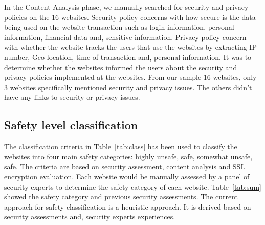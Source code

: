 \documentclass[conference]{IEEEtran}
\begin{document}
In the Content Analysis phase, we manually searched for security and
privacy policies on the 16 websites. Security policy concerns with how
secure is the data being used on the website transaction such as login
information, personal information, financial data and, sensitive
information. Privacy policy concern with whether the website tracks
the users that use the websites by extracting IP number, Geo location,
time of transaction and, personal information. It was to determine
whether the websites informed the users about the security and privacy
policies implemented at the websites.  From our sample 16 websites,
only 3 websites specifically mentioned security and privacy
issues. The others didn't have any links to security or privacy
issues.

\subsection{Safety level classification}

The classification criteria in Table~\ref{tab:class} has been used to
classify the websites into four main safety categories: highly unsafe,
safe, somewhat unsafe, safe. The criteria are based on security
assessment, content analysis and SSL encryption evaluation. Each
website would be manually assessed by a panel of security experts to
determine the safety category of each website. Table~\ref{tab:sum}
showed the safety category and  previous security assessments. The
current approach for safety classification is a heuristic approach. It
is derived based on security assessments and, security experts
experiences.
\end{document}
